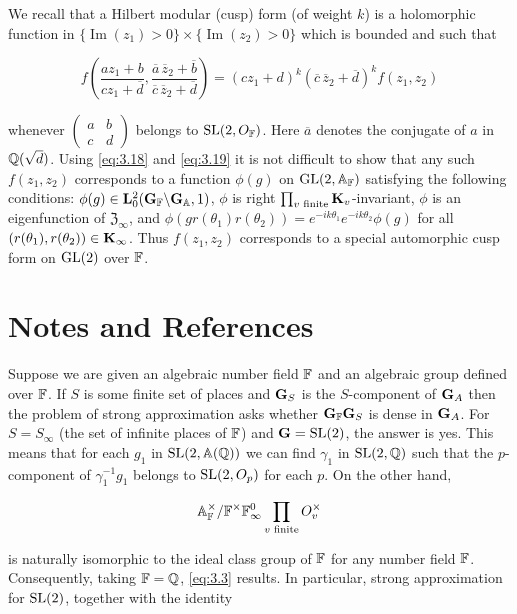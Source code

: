 \begin{example}
We recall that a Hilbert modular (cusp) form (of weight $k$) is a holomorphic function in $\{\operatorname{Im}(z_1) > 0\}\times\{\operatorname{Im}(z_2) > 0\}$ which is bounded and such that

\[
f\left(\frac{az_1+b}{cz_1+\overline{d}}, \frac{\overline{a}\,\overline{z}_2+\overline{b}}{\overline{c}\,\overline{z}_2+\overline{d}}\right) = (cz_1+d)^k(\overline{c}\,\overline{z}_2+\overline{d})^k f(z_1,z_2)
\]

whenever $\begin{pmatrix} a & b \\ c & d \end{pmatrix}$ belongs to $\operatorname{SL}(2,O_{\mathbb{F}})$. Here $\overline{a}$ denotes the conjugate of $a$ in $\mathbb{Q}(\sqrt{d})$. Using \eqref{eq:3.18} and \eqref{eq:3.19} it is not difficult to show that any such $f(z_1,z_2)$ corresponds to a function $\phi(g)$ on $\operatorname{GL}(2,\mathbb{A}_{\mathbb{F}})$ satisfying the following conditions: $\phi(g) \in \mathbf{L}_0^2(\mathbf{G}_{\mathbb{F}}\backslash\mathbf{G}_{\mathbb{A}},1)$, $\phi$ is right $\prod_{v\text{ finite}}\mathbf{K}_v$-invariant, $\phi$ is an eigenfunction of $\mathfrak{Z}_\infty$, and $\phi(gr(\theta_1)r(\theta_2)) = e^{-ik\theta_1}e^{-ik\theta_2}\phi(g)$ for all $(r(\theta_1),r(\theta_2)) \in \mathbf{K}_\infty$. Thus $f(z_1,z_2)$ corresponds to a special automorphic cusp form on $\operatorname{GL}(2)$ over $\mathbb{F}$.

\end{example}

\section*{Notes and References}


Suppose we are given an algebraic number field $\mathbb{F}$ and an algebraic group defined over $\mathbb{F}$. If $S$ is some finite set of places and $\mathbf{G}_S$ is the $S$-component of $\mathbf{G}_A$ then the problem of strong approximation asks whether $\mathbf{G}_{\mathbb{F}}\mathbf{G}_S$ is dense in $\mathbf{G}_A$. For $S = S_\infty$ (the set of infinite places of $\mathbb{F}$) and $\mathbf{G} = \operatorname{SL}(2)$, the answer is yes. This means that for each $g_1$ in $\operatorname{SL}(2,\mathbb{A}(\mathbb{Q}))$ we can find $\gamma_1$ in $\operatorname{SL}(2,\mathbb{Q})$ such that the $p$-component of $\gamma_1^{-1}g_1$ belongs to $\operatorname{SL}(2,O_p)$ for each $p$. On the other hand,

\[
\mathbb{A}_{\mathbb{F}}^{\times}/\mathbb{F}^{\times}\mathbb{F}_\infty^0\prod_{v\text{ finite}}O_v^{\times}
\]

is naturally isomorphic to the ideal class group of $\mathbb{F}$ for any number field $\mathbb{F}$. Consequently, taking $\mathbb{F} = \mathbb{Q}$, \eqref{eq:3.3} results. In particular, strong approximation for $\operatorname{SL}(2)$, together with the identity

